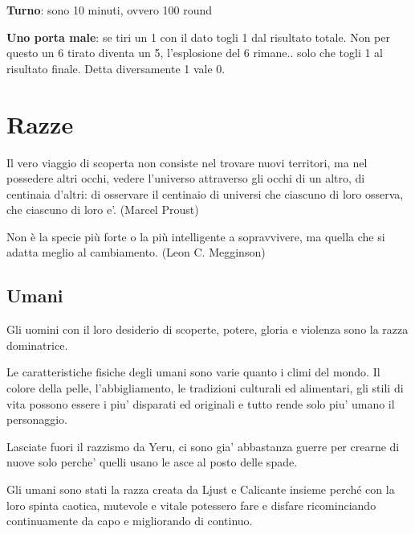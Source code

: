 \documentclass[a4paper,11pt,twoside,openany]{book}
\begin{document}
\textbf{Turno}: sono 10 minuti, ovvero 100 round

\textbf{Uno porta male}: se tiri un 1 con il dato togli 1 dal risultato totale. Non per questo un 6 tirato diventa un 5, l’esplosione del 6 rimane.. solo che togli 1 al risultato finale. Detta diversamente 1 vale 0.



\pagebreak

\section{Razze}
\begin{tcolorbox}[enhanced,arc=5pt,boxrule=0.3pt]{Il vero viaggio di scoperta non consiste nel trovare nuovi territori, ma nel possedere altri occhi, vedere l'universo attraverso gli occhi di un altro, di centinaia d'altri: di osservare il centinaio di universi che ciascuno di loro osserva, che ciascuno di loro e'. (Marcel Proust)}\end{tcolorbox}\medskip


\begin{tcolorbox}[enhanced,arc=5pt,boxrule=0.3pt]{Non è la specie più forte o la più intelligente a sopravvivere, ma quella che si adatta meglio al cambiamento. (Leon C. Megginson)}\end{tcolorbox}\medskip

\subsection{Umani}

Gli uomini con il loro desiderio di scoperte, potere, gloria e violenza sono la razza dominatrice.

Le caratteristiche fisiche degli umani sono varie quanto i climi del mondo. Il colore della pelle, l'abbigliamento, le tradizioni culturali ed alimentari, gli stili di vita possono essere i piu' disparati ed originali e tutto rende solo piu' umano il personaggio.

Lasciate fuori il razzismo da Yeru, ci sono gia' abbastanza guerre per crearne di nuove solo perche' quelli usano le asce al posto delle spade.

Gli umani sono stati la razza creata da Ljust e Calicante insieme perché con la loro spinta caotica, mutevole e vitale potessero fare e disfare ricominciando continuamente da capo e migliorando di continuo.
\end{document}
